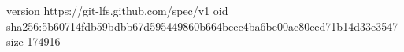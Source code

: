 version https://git-lfs.github.com/spec/v1
oid sha256:5b60714fdb59bdbb67d595449860b664bcec4ba6be00ac80ced71b14d33e3547
size 174916

